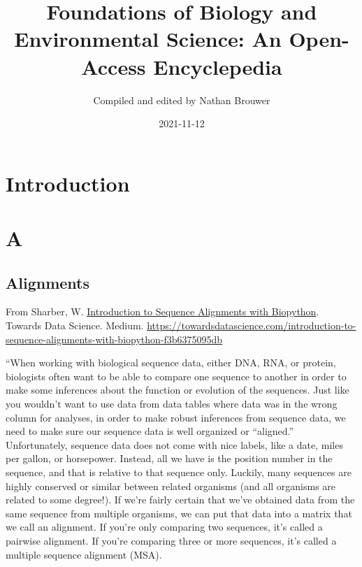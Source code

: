 \documentclass[
]{book}
\title{Foundations of Biology and Environmental Science: An Open-Access Encyclepedia}
\author{Compiled and edited by Nathan Brouwer}
\date{2021-11-12}
\begin{document}
\maketitle

{
\setcounter{tocdepth}{1}
\tableofcontents
}
\hypertarget{introduction}{%
\chapter{Introduction}\label{introduction}}

\hypertarget{a}{%
\chapter{A}\label{a}}

\hypertarget{alignments}{%
\section{Alignments}\label{alignments}}

From Sharber, W. \href{https://towardsdatascience.com/introduction-to-sequence-alignments-with-biopython-f3b6375095db}{Introduction to Sequence Alignments with Biopython}. Towards Data Science. Medium.
\url{https://towardsdatascience.com/introduction-to-sequence-alignments-with-biopython-f3b6375095db}

``When working with biological sequence data, either DNA, RNA, or protein, biologists often want to be able to compare one sequence to another in order to make some inferences about the function or evolution of the sequences. Just like you wouldn't want to use data from data tables where data was in the wrong column for analyses, in order to make robust inferences from sequence data, we need to make sure our sequence data is well organized or ``aligned.'' Unfortunately, sequence data does not come with nice labels, like a date, miles per gallon, or horsepower. Instead, all we have is the position number in the sequence, and that is relative to that sequence only. Luckily, many sequences are highly conserved or similar between related organisms (and all organisms are related to some degree!). If we're fairly certain that we've obtained data from the same sequence from multiple organisms, we can put that data into a matrix that we call an alignment. If you're only comparing two sequences, it's called a pairwise alignment. If you're comparing three or more sequences, it's called a multiple sequence alignment (MSA).
\end{document}
